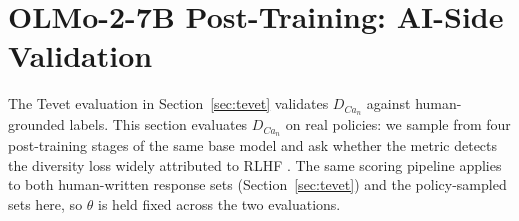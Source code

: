 

\section{OLMo-2-7B Post-Training: AI-Side Validation}\label{sec:rlhf-experiment}

The Tevet evaluation in Section~\ref{sec:tevet} validates $D_{Ca_n}$ against human-grounded labels.
This section evaluates $D_{Ca_n}$ on real policies: we sample from four post-training stages of the same base model and ask whether the metric detects the diversity loss widely attributed to RLHF \citep{kirk2023rlhf,zhang2025verbalizedsampling,padmakumar2023writingreduces}.
The same scoring pipeline applies to both human-written response sets (Section~\ref{sec:tevet}) and the policy-sampled sets here, so $\theta$ is held fixed across the two evaluations.

